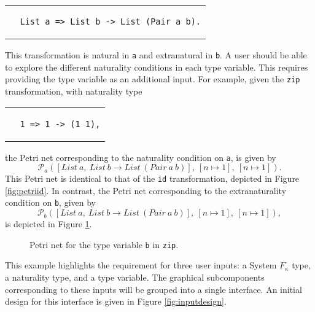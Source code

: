 \documentclass[../Dissertation.tex]{subfiles}
\begin{document}
\begin{center}
\begin{tabular}{c}
\begin{lstlisting}
  List a => List b -> List (Pair a b).
\end{lstlisting}
\end{tabular}
\end{center}
This transformation is natural in \lstinline{a} and extranatural in \lstinline{b}. A user should be able to explore the different naturality conditions in each type variable. This requires providing the type variable as an additional input. For example, given the \lstinline{zip} transformation, with naturality type
\begin{center}
\begin{tabular}{c}
\begin{lstlisting}
  1 => 1 -> (1 1),
\end{lstlisting}
\end{tabular}
\end{center}
the Petri net corresponding to the naturality condition on \lstinline{a}, is given by
\begin{equation*}
  \mathcal{P}_a([List\ a,\ List\ b \rightarrow List\ (Pair\ a\ b)],\ [n \mapsto 1],\ [n \mapsto 1]).
\end{equation*}
This Petri net is identical to that of the \lstinline{id} transformation, depicted in Figure \ref{fig:petriid}. In contrast, the Petri net corresponding to the extranaturality condition on \lstinline{b}, given by
\begin{equation*}
  \mathcal{P}_b([List\ a,\ List\ b \rightarrow List\ (Pair\ a\ b)],\ [n \mapsto 1],\ [n \mapsto 1]),
\end{equation*}
is depicted in Figure \ref{fig:petrizipb}.
 
\begin{figure}[H]
  \begin{center}
  \end{center}
  \caption{Petri net for the type variable \lstinline{b} in \lstinline{zip}.}
  \label{fig:petrizipb}
\end{figure}
This example highlights the requirement for three user inputs: a System $F_\kappa$ type, a naturality type, and a type variable. The graphical subcomponents corresponding to these inputs will be grouped into a single interface. An initial design for this interface is given in Figure \ref{fig:inputdesign}.
\end{document}
